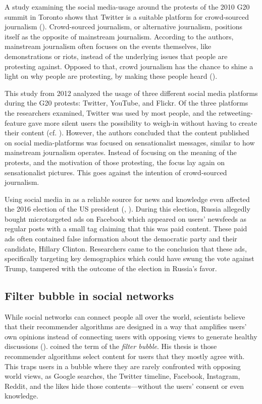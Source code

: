 A study examining the social media-usage around the protests of the 2010 G20 summit in Toronto shows that Twitter is a suitable platform for crowd-sourced journalism (\cite{poell2012twitter}). Crowd-sourced journalism, or alternative journalism, positions itself as the opposite of mainstream journalism. According to the authors, mainstream journalism often focuses on the events themselves, like demonstrations or riots, instead of the underlying issues that people are protesting against. Opposed to that, crowd journalism has the chance to shine a light on why people are protesting, by making these people heard (\cite[698]{poell2012twitter}). 

This study from 2012 analyzed the usage of three different social media platforms during the G20 protests: Twitter, YouTube, and Flickr. Of the three platforms the researchers examined, Twitter was used by most people, and the retweeting-feature gave more silent users the possibility to weigh-in without having to create their content (cf. \cite[709]{poell2012twitter}). However, the authors concluded that the content published on social media-platforms was focused on sensationalist messages, similar to how mainstream journalism operates. Instead of focusing on the meaning of the protests, and the motivation of those protesting, the focus lay again on sensationalist pictures. This goes against the intention of crowd-sourced journalism.

Using social media in as a reliable source for news and knowledge even affected the 2016 election of the US president (\cite{duttSenatorWeSell2018}, \cite{ribeiroMicrotargetingSociallyDivisive2019}). During this election, Russia allegedly bought microtargeted ads on Facebook which appeared on users' newsfeeds as regular posts with a small tag claiming that this was paid content. These paid ads often contained false information about the democratic party and their candidate, Hillary Clinton. Researchers came to the conclusion that these ads, specifically targeting key demographics which could have swung the vote against Trump, tampered with the outcome of the election in Russia's favor.

\subsection{Filter bubble in social networks}
While social networks can connect people all over the world, scientists believe that their recommender algorithms are designed in a way that amplifies users' own opinions instead of connecting users with opposing views to generate healthy discussions (\cite{pariser2011filter}). \citeauthor{pariser2011filter} coined the term of the \emph{filter bubble}. His thesis is those recommender algorithms select content for users that they mostly agree with. This traps users in a bubble where they are rarely confronted with opposing world views, as Google searches, the Twitter timeline, Facebook, Instagram, Reddit, and the likes hide those contents---without the users' consent or even knowledge.

